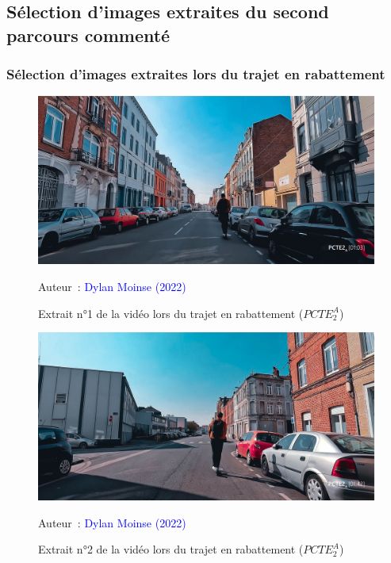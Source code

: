     \newpage
\subsection{Sélection d'images extraites du second parcours commenté}
    \label{annexes:photos-pcte2}

\subsubsection{Sélection d'images extraites lors du trajet en rabattement}

    \begin{figure}[h!]\vspace*{4pt}
        \caption*{Extrait n°1 de la vidéo lors du trajet en rabattement (\(PCTE^{A}_{2}\))}
        \centerline{\includegraphics[width=0.75\columnwidth]{src/Figures/Annexes/Extrait_Video_PCTE2_Access_1.jpg}}
        \vspace{5pt}
        \begin{flushright}\scriptsize{
        Auteur~: \textcolor{blue}{Dylan Moinse (2022)}
        }\end{flushright}
    \end{figure}

    \begin{figure}[h!]\vspace*{4pt}
        \caption*{Extrait n°2 de la vidéo lors du trajet en rabattement (\(PCTE^{A}_{2}\))}
        \centerline{\includegraphics[width=0.75\columnwidth]{src/Figures/Annexes/Extrait_Video_PCTE2_Access_2.jpg}}
        \vspace{5pt}
        \begin{flushright}\scriptsize{
        Auteur~: \textcolor{blue}{Dylan Moinse (2022)}
        }\end{flushright}
    \end{figure}
    

